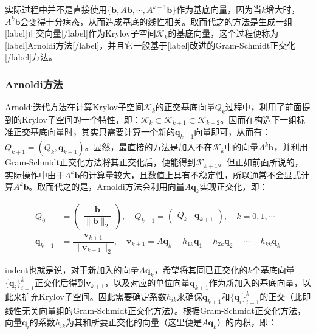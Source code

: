 \documentclass[UTF8,nofonts]{ctexart}
\begin{document}
实际过程中并不是直接使用$\{\boldsymbol{b},A\boldsymbol{b},\cdots,A^{k-1}\boldsymbol{b}\}$作为基底向量，因为当$k$增大时，$A^k\boldsymbol{b}$会变得十分病态，从而造成基底的线性相关。取而代之的方法是生成一组[label]正交向量[/label]作为Krylov子空间$\mathcal{K}_k$的基底向量，这个过程便称为[label]Arnoldi方法[/label]，并且它一般基于[label]改进的Gram-Schmidt正交化[/label]方法。

\subsubsection*{Arnoldi方法}

Arnoldi迭代方法在计算Krylov子空间$\mathcal{K}_k$的正交基底向量$Q_k$过程中，利用了前面提到的Krylov子空间的一个特性，即：$\mathcal{K}_k\subset\mathcal{K}_{k+1}\subset\mathcal{K}_{k+2}$。因而在构造下一组标准正交基底向量时，其实只需要计算一个新的$\boldsymbol{q}_{k+1}$向量即可，从而有：$Q_{k+1}=(Q_k,\boldsymbol{q}_{k+1})$。显然，最直接的方法是加入不在$\mathcal{K}_k$中的向量$A^k\boldsymbol{b}$，并利用Gram-Schmidt正交化方法将其正交化后，便能得到$\mathcal{K}_{k+1}$。但正如前面所说的，实际操作中由于$A^{k}\boldsymbol{b}$的计算量较大，且数值上具有不稳定性，所以通常不会显式计算$A^k\boldsymbol{b}$。取而代之的是，Arnoldi方法会利用向量$A\boldsymbol{q}_k$实现正交化，即：

\begin{equation}
\label{eq:qm1}
\begin{aligned}
Q_0 &=
\begin{pmatrix}
	\dfrac{\boldsymbol{b}}{\|\boldsymbol{b}\|_2}
\end{pmatrix},\quad
Q_{k+1}=
\begin{pmatrix}
	Q_{k}&\boldsymbol{q}_{k+1}
\end{pmatrix},\quad k=0,1,\cdots \\
\boldsymbol{q}_{k+1} &= \dfrac{\boldsymbol{v}_{k+1}}{\|\boldsymbol{v}_{k+1}\|_2},\quad
\boldsymbol{v}_{k+1}=A\boldsymbol{q}_k-h_{1k}\boldsymbol{q}_1-h_{2k}\boldsymbol{q}_2-\cdots-h_{kk}\boldsymbol{q}_k
\end{aligned}
\end{equation}

indent也就是说，对于新加入的向量$A\boldsymbol{q}_k$，希望将其同已正交化的$k$个基底向量$\{\boldsymbol{q}_i\}_{i=1}^k$正交化后得到$\boldsymbol{v}_{k+1}$，以及对应的单位向量$\boldsymbol{q}_{k+1}$作为新加入的基底向量，以此来扩充Krylov子空间。因此需要确定系数$h_{ik}$来确保$\boldsymbol{q}_{k+1}$和$\{\boldsymbol{q}_i\}_{i=1}^{k}$的正交（此即线性无关向量组的Gram-Schmidt正交化方法）。根据Gram-Schmidt正交化方法，向量$\boldsymbol{q}_i$的系数$h_{ik}$为其和所要正交化的向量（这里便是$A\boldsymbol{q}_k$）的内积，即：
\end{document}
